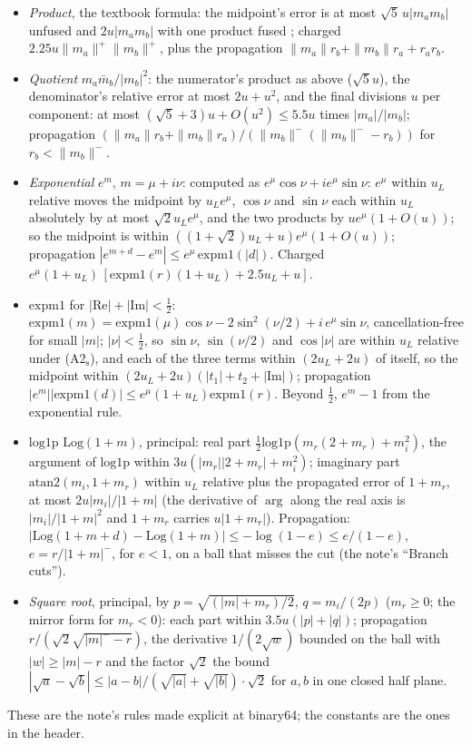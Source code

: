 \documentclass[11pt]{article}
\theoremstyle{definition}
\newcommand{\Log}{\mathrm{Log}}
\newcommand{\lop}{\mathrm{log1p}}
\newcommand{\emo}{\mathrm{expm1}}
\begin{document}
\begin{itemize}
\item \emph{Product}, the textbook formula: the midpoint's error is at most $\sqrt5\,u|m_am_b|$ unfused
\cite{bpz} and $2u|m_am_b|$ with one product fused \cite{jklm}; charged $2.25u\|m_a\|^+\|m_b\|^+$, plus the
propagation $\|m_a\|r_b+\|m_b\|r_a+r_ar_b$.
\item \emph{Quotient} $m_a\bar m_b/|m_b|^2$: the numerator's product as above ($\sqrt5u$), the denominator's
relative error at most $2u+u^2$, and the final divisions $u$ per component: at most $(\sqrt5+3)u+O(u^2)\le5.5u$
times $|m_a|/|m_b|$; propagation $(\|m_a\|r_b+\|m_b\|r_a)/(\|m_b\|^-(\|m_b\|^--r_b))$ for $r_b<\|m_b\|^-$.
\item \emph{Exponential} $e^{m}$, $m=\mu+i\nu$: computed as $e^\mu\cos\nu+ie^\mu\sin\nu$: $e^\mu$ within $u_L$
relative moves the midpoint by $u_Le^\mu$, $\cos\nu$ and $\sin\nu$ each within $u_L$ absolutely by at most
$\sqrt2u_Le^\mu$, and the two products by $ue^\mu(1+O(u))$; so the midpoint is within $((1+\sqrt2)u_L+u)e^\mu
(1+O(u))$; propagation $|e^{m+d}-e^m|\le e^\mu\,\emo(|d|)$. Charged $e^\mu(1+u_L)\,[\emo(r)(1+u_L)+2.5u_L+u]$.
\item \emph{$\emo$} for $|\mathrm{Re}|+|\mathrm{Im}|<\frac12$: $\emo(m)=\emo(\mu)\cos\nu-2\sin^2(\nu/2)+i\,e^\mu
\sin\nu$, cancellation-free for small $|m|$; $|\nu|<\frac12$, so $\sin\nu$, $\sin(\nu/2)$ and $\cos|\nu|$ are
within $u_L$ relative under (A2$_{\mathrm s}$), and each of the three terms within $(2u_L+2u)$ of itself, so the
midpoint
within $(2u_L+2u)(|t_1|+t_2+|\mathrm{Im}|)$; propagation $|e^{m}||\emo(d)|\le e^\mu(1+u_L)\emo(r)$. Beyond
$\frac12$, $e^m-1$ from the exponential rule.
\item \emph{$\lop$} $\Log(1+m)$, principal: real part $\frac12\lop(m_r(2+m_r)+m_i^2)$, the argument of $\lop$ within
$3u(|m_r||2+m_r|+m_i^2)$; imaginary part $\mathrm{atan2}(m_i,1+m_r)$ within $u_L$ relative plus the propagated
error of $1+m_r$, at most $2u|m_i|/|1+m|$ (the derivative of $\arg$ along the real axis is $|m_i|/|1+m|^2$ and
$1+m_r$ carries $u|1+m_r|$). Propagation: $|\Log(1+m+d)-\Log(1+m)|\le-\log(1-e)\le e/(1-e)$, $e=r/|1+m|^-$, for
$e<1$, on a ball that misses the cut (the note's ``Branch cuts'').
\item \emph{Square root}, principal, by $p=\sqrt{(|m|+m_r)/2}$, $q=m_i/(2p)$ ($m_r\ge0$; the mirror form for
$m_r<0$): each part within $3.5u(|p|+|q|)$; propagation $r/(\sqrt2\sqrt{|m|^--r})$, the derivative $1/(2\sqrt w)$
bounded on the ball with $|w|\ge|m|-r$ and the factor $\sqrt2$ the bound $|\sqrt a-\sqrt b|\le|a-b|/(\sqrt{|a|}+
\sqrt{|b|})\cdot\sqrt2$ for $a,b$ in one closed half plane.
\end{itemize}
These are the note's rules made explicit at binary64; the constants are the ones in the header.
\end{document}
